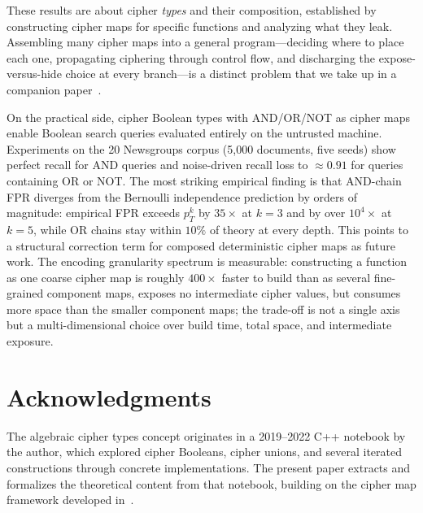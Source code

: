\documentclass[11pt]{article}
\theoremstyle{definition}
\theoremstyle{plain}
\theoremstyle{remark}
\begin{document}
These results are about cipher \emph{types} and their composition,
established by constructing cipher maps for specific functions and
analyzing what they leak.
Assembling many cipher maps into a general program---deciding where to
place each one, propagating ciphering through control flow, and
discharging the expose-versus-hide choice at every branch---is a
distinct problem that we take up in a companion
paper~\cite{towell2026cipherprog}.

On the practical side, cipher Boolean types with AND/OR/NOT as cipher
maps enable Boolean search queries evaluated entirely on the untrusted
machine.
Experiments on the 20 Newsgroups corpus (5{,}000 documents, five
seeds) show perfect recall for AND queries and noise-driven recall
loss to $\approx 0.91$ for queries containing OR or NOT.
The most striking empirical finding is that AND-chain FPR diverges
from the Bernoulli independence prediction by orders of magnitude:
empirical FPR exceeds $p_T^k$ by $35\times$ at $k = 3$ and by
over $10^4\times$ at $k = 5$, while OR chains stay within $10\%$ of
theory at every depth.
This points to a structural correction term for composed deterministic
cipher maps as future work.
The encoding granularity spectrum is measurable: constructing a
function as one coarse cipher map is roughly $400\times$ faster to
build than as several fine-grained component maps, exposes no
intermediate cipher values, but consumes more space than the smaller
component maps; the trade-off is not a single axis but a
multi-dimensional choice over build time, total space, and intermediate
exposure.

\section*{Acknowledgments}

The algebraic cipher types concept originates in a 2019--2022 C++
notebook by the author, which explored cipher Booleans, cipher
unions, and several iterated constructions through concrete
implementations.
The present paper extracts and formalizes the theoretical content
from that notebook, building on the cipher map framework developed
in~\cite{towell2026cipher}.



\end{document}
